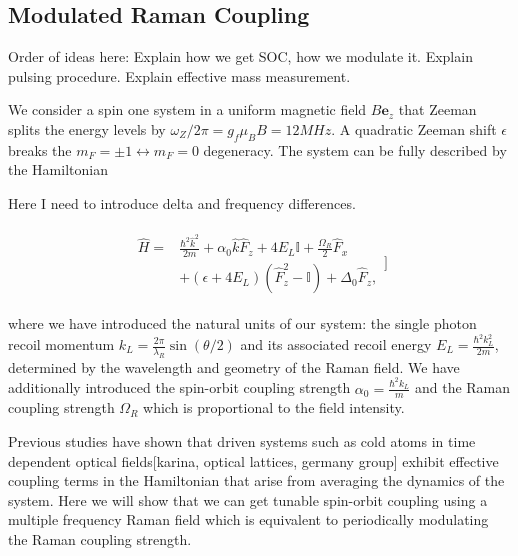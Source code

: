 
\subsection{Modulated Raman Coupling}

Order of ideas here:
Explain how we get SOC, how we modulate it.
Explain pulsing procedure.
Explain effective mass measurement. 





We consider a spin one system in a uniform magnetic field  $B\mathbf{e}_z$ that Zeeman splits the energy levels by $\omega_Z/2\pi=g_f\mu_BB = 12 MHz$. A quadratic Zeeman shift $\epsilon$ breaks the $m_F=\pm1\leftrightarrow m_F=0$ degeneracy. The system can be fully described by the Hamiltonian

Here I need to introduce delta and frequency differences. 

\begin{align}
	\begin{split}
		\hat{H} = &\frac{\hbar^2\hat{k}^2}{2m} + \alpha_0\hat{k}\hat{F}_z +4E_L\mathbb{I} + \frac{\Omega_R}{2}\hat{F}_x\\
		& +(\epsilon+4E_L)(\hat{F}_z^2-\mathbb{I}) +\Delta_0\hat{F}_z, 
		\label{Eq:SOCone}
	\end{split}]
\end{align}	


where we have introduced the natural units of our system: the single photon recoil momentum $k_L=\frac{2\pi}{\lambda_R}\sin(\theta/2)$ and its associated recoil energy $E_L=\frac{\hbar^2k_L^2}{2m}$, determined by the wavelength and geometry of the Raman field. We have additionally introduced the spin-orbit coupling strength $\alpha_0=\frac{\hbar^2k_L}{m}$ and the Raman coupling strength $\Omega_R$ which is proportional to the field intensity. 

Previous studies have shown that driven systems such as cold atoms in time dependent optical fields[karina, optical lattices, germany group] exhibit effective coupling terms in the Hamiltonian that arise from averaging the dynamics of the system. Here we will show that we can get tunable spin-orbit coupling using a multiple frequency Raman field which is equivalent to periodically modulating the Raman coupling strength.



